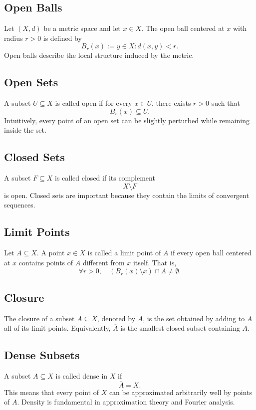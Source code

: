 \documentclass[aps,prl,twocolumn,groupedaddress]{revtex4-2}
\begin{document}
\subsection{Open Balls}

Let $(X,d)$ be a metric space and let $x\in X$.
The open ball centered at $x$ with radius $r>0$ is defined by
$$
B_r(x):={y\in X:d(x,y)<r}.
$$
Open balls describe the local structure induced by the metric.

\subsection{Open Sets}

A subset $U\subseteq X$ is called open if for every $x\in U$, there exists $r>0$ such that
$$
B_r(x)\subseteq U.
$$
Intuitively, every point of an open set can be slightly perturbed while remaining inside the set.

\subsection{Closed Sets}

A subset $F\subseteq X$ is called closed if its complement
$$
X\setminus F
$$
is open.
Closed sets are important because they contain the limits of convergent sequences.

\subsection{Limit Points}

Let $A\subseteq X$.
A point $x\in X$ is called a limit point of $A$ if every open ball centered at $x$ contains points of $A$ different from $x$ itself.
That is,
$$
\forall r>0,\quad
(B_r(x)\setminus{x})\cap A\neq\emptyset.
$$

\subsection{Closure}
The closure of a subset $A\subseteq X$, denoted by $\overline{A}$, is the set obtained by adding to $A$ all of its limit points.
Equivalently, $\overline{A}$ is the smallest closed subset containing $A$.

\subsection{Dense Subsets}

A subset $A\subseteq X$ is called dense in $X$ if
$$
\overline{A}=X.
$$
This means that every point of $X$ can be approximated arbitrarily well by points of $A$.
Density is fundamental in approximation theory and Fourier analysis.
\end{document}
